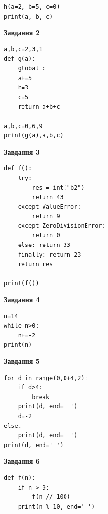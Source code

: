 \documentclass[12pt, ukrainian]{article}
\begin{document}
{{{{\begin{minipage}[t]{7.5cm}
\begin{verbatim}
h(a=2, b=5, c=0)
print(a, b, c)
\end{verbatim}



\begin{center}
\textbf{Завдання 2}
\end{center}

\begin{verbatim}
a,b,c=2,3,1
def g(a):
    global c
    a+=5
    b=3
    c=5
    return a+b+c

a,b,c=0,6,9
print(g(a),a,b,c)
\end{verbatim}



\begin{center}
\textbf{Завдання 3}
\end{center}

\begin{verbatim}
def f():
    try:
        res = int("b2")
        return 43
    except ValueError: 
        return 9
    except ZeroDivisionError: 
        return 0
    else: return 33
    finally: return 23
    return res

print(f())
\end{verbatim}



\begin{center}
\textbf{Завдання 4}
\end{center}

\begin{verbatim}
n=14
while n>0:
    n+=-2
print(n)
\end{verbatim}

\end{minipage}
\vline \hspace{6mm}
\begin{minipage}[t]{10.5cm}

\begin{center}
\textbf{Завдання 5}
\end{center}

\begin{verbatim}
for d in range(0,0+4,2):
    if d>4:
        break
    print(d, end=' ')
    d=-2
else:
    print(d, end=' ')
print(d, end=' ')
\end{verbatim}



\begin{center}
\textbf{Завдання 6}
\end{center}

\begin{verbatim}
def f(n):
    if n > 9:
        f(n // 100)
    print(n % 10, end=' ')
    


\end{verbatim}
\end{minipage}}}}}
\end{document}
